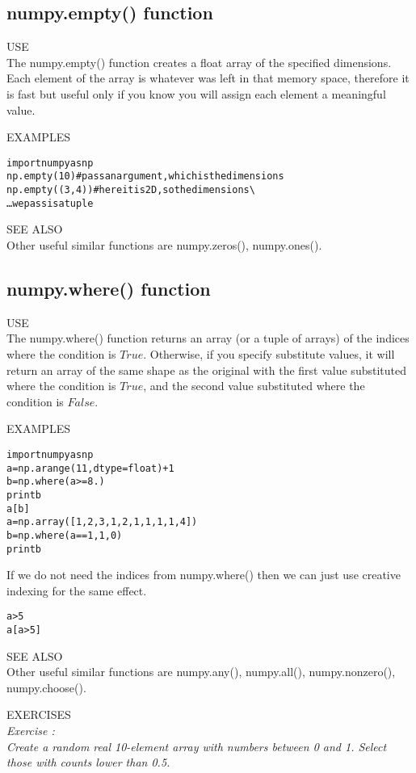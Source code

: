 \subsection{ {\sf numpy.empty() } function}
{\color{blue} {\sf\small USE}} \\
The {\sf\small numpy.empty()} function creates a float array of the
specified dimensions. Each element of the array is whatever was left
in that memory space, therefore it is fast but useful only if you know
you will assign each element a meaningful value.
  
{\color{blue} {\sf\small EXAMPLES}} 
\begin{alltt}
\pytab import numpy as np 
\pytab np.empty(10)   #pass an argument, which is the dimensions
\pytab np.empty((3,4)) #here it is 2D, so the dimensions \textbackslash
\ldots    we pass is a tuple
\end{alltt}

{\color{blue} {\sf\small SEE ALSO}} \\
Other useful similar functions are {\sf\small numpy.zeros(), numpy.ones()}.

\subsection{ {\sf numpy.where() } function}
{\color{blue} {\sf\small USE}} \\
The {\sf\small numpy.where()} function returns an array (or a tuple of
arrays) of the indices where the condition is $True$.  Otherwise, if you
specify substitute values, it will return an array of the same shape as
the original with the first value substituted where the condition is
$True$, and the second value substituted where the condition is $False$.
  
{\color{blue} {\sf\small EXAMPLES}} 
\begin{alltt}
\pytab import numpy as np
\pytab a = np.arange(11, dtype=float) + 1
\pytab b = np.where(a >= 8.) 
\pytab print b 
\pytab a[b] 
\pytab a = np.array([1,2,3,1,2,1,1,1,1,4]) 
\pytab b = np.where(a == 1, 1,0) 
\pytab print b 
\end{alltt}
If we do not need the indices from {\sf\small numpy.where()} then we
can just use creative indexing for the same effect.
\begin{alltt}
\pytab a > 5
\pytab a[a>5]
\end{alltt}

{\color{blue} {\sf\small SEE ALSO}} \\
Other useful similar functions are {\sf\small numpy.any(),
  numpy.all(), numpy.nonzero(), numpy.choose()}.
 
{\color{blue} {\sf\small EXERCISES}} \\
{\it Exercise  :  \\
Create a random real 10-element array with numbers between 0 and 1.
Select those with counts lower than 0.5.}

